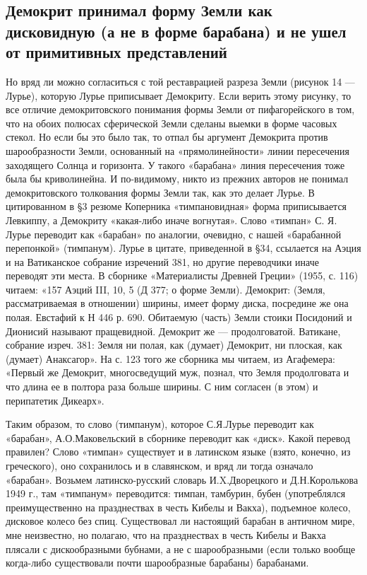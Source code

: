 \subsection{Демокрит  принимал форму  Земли  как дисковидную  (а не  в
форме барабана) и не ушел от примитивных представлений}

Но  вряд  ли  можно  согласиться  с  той  реставрацией  разреза  Земли
(рисунок  14 ---  Лурье),  которую Лурье  приписывает Демокриту.  Если
верить этому  рисунку, то все отличие  демокритовского понимания формы
Земли  от  пифагорейского в  том,  что  на обоих  полюсах  сферической
Земли  сделаны выемки  в форме  часовых стекол.  Но если  бы это  было
так,  то  отпал бы  аргумент  Демокрита  против шарообразности  Земли,
основанный  на «прямолинейности»  линии пересечения  заходящего Солнца
и  горизонта.  У такого  «барабана»  линия  пересечения тоже  была  бы
криволинейна.  И  по-видимому, никто  из  прежних  авторов не  понимал
демокритовского толкования  формы Земли так,  как это делает  Лурье. В
цитированном в §3 резюме Коперника «тимпановидная» форма приписывается
Левкиппу, а  Демокриту «какая-либо иначе вогнутая».  Слово «тимпан» С.
Я.  Лурье  переводит как  «барабан»  по  аналогии, очевидно,  с  нашей
«барабанной перепонкой» (тимпанум). Лурье в цитате, приведенной в §34,
ссылается на Аэция и на  Ватиканское собрание изречений 381, но другие
переводчики  иначе  переводят  эти  места.  В  сборнике  «Материалисты
Древней Греции» (1955, с. 116) читаем: «157 Аэций III, 10, 5 (Д 377; о
форме Земли).  Демокрит: (Земля, рассматриваемая в  отношении) ширины,
имеет  форму диска,  посредине  же  она полая.  Евстафий  к  Н 446  р.
690.  Обитаемую (часть)  Земли  стоики Посидоний  и Дионисий  называют
пращевидной. Демокрит же ---  продолговатой. Ватикане, собрание изреч.
381: Земля ни  полая, как (думает) Демокрит, ни  плоская, как (думает)
Анаксагор».  На с.  123  того  же сборника  мы  читаем, из  Агафемера:
«Первый же Демокрит, многосведущий муж, познал, что Земля продолговата
и что длина ее в полтора раза больше ширины. С ним согласен (в этом) и
перипатетик Дикеарх».

Таким образом,  то слово  (тимпанум), которое С.Я.Лурье  переводит как
«барабан»,  А.О.Маковельский в  сборнике переводит  как «диск».  Какой
перевод  правилен?  Слово  «тимпан»  существует и  в  латинском  языке
(взято, конечно,  из греческого),  оно сохранилось  и в  славянском, и
вряд  ли тогда  означало «барабан».  Возьмем латинско-русский  словарь
И.X.Дворецкого и  Д.Н.Королькова 1949 г., там  «тимпанум» переводится:
тимпан, тамбурин, бубен  (употреблялся преимущественно на празднествах
в честь Кибелы  и Вакха), подъемное колесо, дисковое  колесо без спиц.
Существовал ли настоящий  барабан в античном мире,  мне неизвестно, но
полагаю,  что  на  празднествах  в  честь Кибелы  и  Вакха  плясали  с
дискообразными  бубнами,  а не  с  шарообразными  (если только  вообще
когда-либо существовали почти шарообразные барабаны) барабанами.

